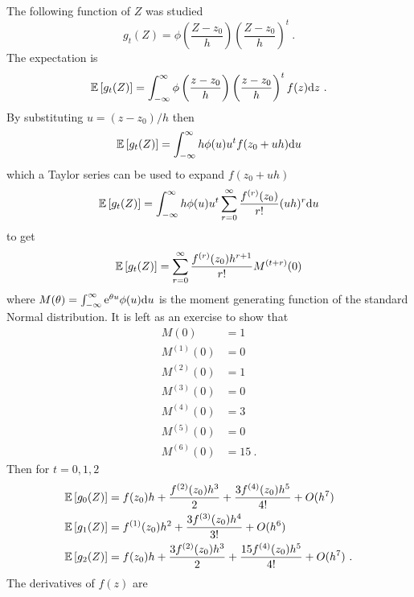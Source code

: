 The following function of $Z$ was studied
\begin{equation}
g_t(Z) = \phi\left(
  \dfrac{Z - z_0}{h}
\right)
\left(
  \dfrac{Z - z_0}{h}
\right)^t
\ .
\end{equation}
The expectation is
\begin{equation}
\operatorname{\mathbb{E}}\left[g_t(Z)\right] = 
\int_{-\infty}^{\infty}
\phi\left(
  \dfrac{z - z_0}{h}
\right)
\left(
  \dfrac{z - z_0}{h}
\right)^t
f(z) \mathrm{d} z \ .
\end{equation}
By substituting $u=(z-z_0)/h$ then
\begin{equation}
\operatorname{\mathbb{E}}\left[g_t(Z)\right] = 
\int_{-\infty}^{\infty}
h\phi(u)u^tf(z_0+uh)\mathrm{d} u
\end{equation}
which a Taylor series can be used to expand $f(z_0+uh)$
\begin{equation}
\operatorname{\mathbb{E}}\left[g_t(Z)\right] = 
\int_{-\infty}^{\infty}
h\phi(u)u^t
\sum_{r=0}^\infty \dfrac{
  f^{(r)}(z_0)
  }
  {
  r!
  }
(uh)^r
\mathrm{d} u
\end{equation}
to get
\begin{equation}
\operatorname{\mathbb{E}}\left[g_t(Z)\right] = 
\sum_{r=0}^\infty
\dfrac{
  f^{(r)}(z_0)h^{r+1}
}
{
  r!
}
M^{(t+r)}(0)
\end{equation}
where $M(\theta)=\int_{-\infty}^{\infty}\mathrm{e}^{\theta u}\phi(u)\mathrm{d} u$ is the moment generating function of the standard Normal distribution. It is left as an exercise to show that
\begin{align}
M(0) &= 1
\\
M^{(1)}(0) & = 0
\\
M^{(2)}(0) & = 1
\\
M^{(3)}(0) & = 0
\\
M^{(4)}(0) & = 3
\\
M^{(5)}(0) & = 0
\\
M^{(6)}(0) & = 15 \ .
\end{align}
Then for $t=0,1,2$
\begin{align}
\operatorname{\mathbb{E}}\left[g_0(Z)\right]
&=
f(z_0)h
+\dfrac{f^{(2)}(z_0)h^3}{2}
+\dfrac{3f^{(4)}(z_0)h^5}{4!}
+O(h^7)
\label{eq:appendix_expectation1}\\
\operatorname{\mathbb{E}}\left[g_1(Z)\right]
&=
f^{(1)}(z_0)h^2
+\dfrac{3f^{(3)}(z_0)h^4}{3!}
+O(h^6)
\label{eq:appendix_expectation2}\\
\operatorname{\mathbb{E}}\left[g_2(Z)\right]
&=
f(z_0)h
+\dfrac{3f^{(2)}(z_0)h^3}{2}
+\dfrac{15f^{(4)}(z_0)h^5}{4!}
+O(h^7)
\label{eq:appendix_expectation3}\ .
\end{align}
The derivatives of $f(z)$ are
